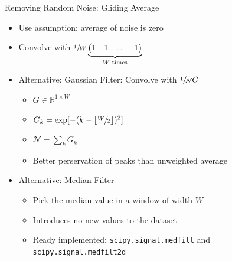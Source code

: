 
\begin{frame}{Removing Random Noise: Gliding Average}
%
\begin{itemize}
\item Use assumption: average of noise is zero
\item Convolve with $
	\sfrac{1}{W} 
	\underbrace{
	\begin{pmatrix}
	1 & 1 & \ldots & 1
	\end{pmatrix}
	}_{W \text{ times}}
	$
\item Alternative: Gaussian Filter: Convolve with $\sfrac{1}{\mathcal{N}} G$
	\begin{itemize}
	\item $G \in \mathbb{R}^{1 \times W}$
	\item $G_k = \exp[-(k - \lfloor\sfrac{W}{2}\rfloor)^2]$
	\item $\mathcal{N} = \sum_k G_k$
	\item Better perservation of peaks than unweighted average
	\end{itemize}
\item Alternative: Median Filter
	\begin{itemize}
	\item Pick the median value in a window of width $W$
	\item Introduces no new values to the dataset
	\item Ready implemented: \texttt{scipy.signal.medfilt} and \texttt{scipy.signal.medfilt2d}
	\end{itemize}
\end{itemize}
%
\end{frame}


